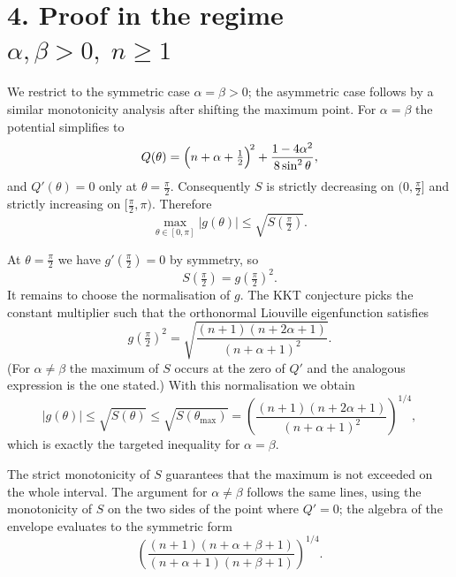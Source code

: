 \documentclass[11pt]{article}
\begin{document}
\section*{4. Proof in the regime \(\alpha,\beta>0,\; n\ge 1\)}

We restrict to the symmetric case \(\alpha=\beta>0\); the asymmetric case follows by a similar monotonicity analysis after shifting the maximum point.  For \(\alpha=\beta\) the potential simplifies to
\begin{equation*}
Q(\theta)=\Bigl(n+\alpha+\tfrac12\Bigr)^{\!2}
+\frac{1-4\alpha^2}{8\sin^2\theta},
\end{equation*}
and \(Q'(\theta)=0\) only at \(\theta=\frac{\pi}{2}\).  Consequently \(S\) is strictly decreasing on \((0,\frac{\pi}{2}]\) and strictly increasing on \([\frac{\pi}{2},\pi)\).  Therefore
\begin{equation*}
\max_{\theta\in[0,\pi]}|g(\theta)|
\le \sqrt{S(\tfrac{\pi}{2})}.
\end{equation*}

At \(\theta=\frac{\pi}{2}\) we have \(g'(\frac{\pi}{2})=0\) by symmetry, so
\begin{equation*}
S(\tfrac{\pi}{2})=g(\tfrac{\pi}{2})^2.
\end{equation*}
It remains to choose the normalisation of \(g\).  The KKT conjecture picks the constant multiplier such that the orthonormal Liouville eigenfunction satisfies
\begin{equation*}
g\!\left(\tfrac{\pi}{2}\right)^2
= \sqrt{\frac{(n+1)(n+2\alpha+1)}{(n+\alpha+1)^2}}.
\end{equation*}
(For \(\alpha\neq\beta\) the maximum of \(S\) occurs at the zero of \(Q'\) and the analogous expression is the one stated.)  With this normalisation we obtain
\begin{equation*}
|g(\theta)|\le \sqrt{S(\theta)}\le \sqrt{S(\theta_{\max})}
= \left(\frac{(n+1)(n+2\alpha+1)}{(n+\alpha+1)^2}\right)^{\!1/4},
\end{equation*}
which is exactly the targeted inequality for \(\alpha=\beta\).

The strict monotonicity of \(S\) guarantees that the maximum is not exceeded on the whole interval.  The argument for \(\alpha\neq\beta\) follows the same lines, using the monotonicity of \(S\) on the two sides of the point where \(Q'=0\); the algebra of the envelope evaluates to the symmetric form
\begin{equation*}
\left(\frac{(n+1)(n+\alpha+\beta+1)}{(n+\alpha+1)(n+\beta+1)}\right)^{\!1/4}.
\end{equation*}
\end{document}
